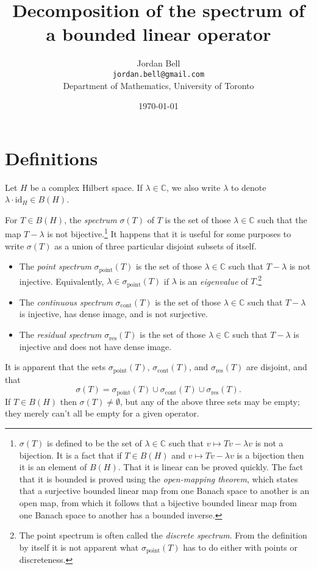 \documentclass{article}
\newcommand{\point}{\sigma_{\textrm{point}}}
\newcommand{\cont}{\sigma_{\textrm{cont}}}
\newcommand{\residual}{\sigma_{\textrm{res}}}
\newcommand{\id}{\textrm{id}}
\begin{document}
\title{Decomposition of the spectrum of a bounded linear operator}
\author{Jordan Bell\\ \texttt{jordan.bell@gmail.com}\\Department of Mathematics, University of Toronto}
\date{\today}


\maketitle

\section{Definitions}
Let $H$ be a complex Hilbert space. If $\lambda \in \mathbb{C}$, we also write $\lambda$ to denote $\lambda \cdot \id_H \in B(H)$.

For $T \in B(H)$, the {\em spectrum} $\sigma(T)$ of $T$ is the set of those $\lambda \in \mathbb{C}$ such that the map
$T-\lambda$ is not bijective.\footnote{$\sigma(T)$
is defined to be the set of $\lambda \in \mathbb{C}$ such that $v \mapsto Tv-\lambda v$ is not a bijection. It is a fact that
if $T \in B(H)$ and $v \mapsto Tv- \lambda v$ is a bijection then it is an element of $B(H)$. That it is linear
can be proved quickly. The fact that it is bounded is proved using the {\em open-mapping theorem}, which states
that a surjective bounded linear map from one Banach space to another is an open map, from which it follows
that a bijective bounded linear map from one Banach space to another has a bounded inverse.}  It happens that it is  useful for some purposes to write $\sigma(T)$ as a union of three particular
 disjoint subsets of itself.
\begin{itemize}
\item The {\em point spectrum} $\point(T)$ is the set of those $\lambda \in \mathbb{C}$
such that $T-\lambda$ is not injective. Equivalently, $\lambda \in \point(T)$ if $\lambda$ is an {\em eigenvalue} of $T$.\footnote{The point spectrum is often called the {\em discrete spectrum}. From the definition by itself it is not apparent what $\point(T)$ has to do either with points or discreteness.}
\item The {\em continuous spectrum} $\cont(T)$ is the set of those $\lambda \in \mathbb{C}$ such that
$T-\lambda$ is injective, has dense image, and is not surjective.
\item The {\em residual spectrum} $\residual(T)$ is the set of those $\lambda \in \mathbb{C}$ such that
$T-\lambda$ is injective and does not have dense image.
\end{itemize}
It is apparent that the sets $\point(T)$, $\cont(T)$, and $\residual(T)$ are disjoint, and that
\[
\sigma(T)=\point(T) \cup \cont(T) \cup \residual(T).
\] 
If $T \in B(H)$ then $\sigma(T) \neq \emptyset$, but any  of the above three sets may
be empty; they merely can't all be empty for a given operator.
\end{document}

